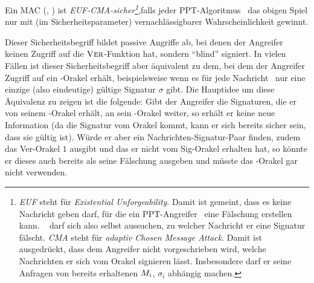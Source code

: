 Ein MAC (\sig, \ver) ist \textit{EUF-CMA-sicher\footnote{\textit{EUF} steht für
    \textit{Existential Unforgeability}. Damit ist gemeint, dass es
    keine Nachricht geben darf, für die ein PPT-Angreifer \A~eine
    Fälschung erstellen kann. \A~ darf sich also selbst aussuchen, zu
    welcher Nachricht er eine Signatur fälscht. \textit{CMA}
    steht für \textit{adaptiv Chosen Message Attack}. Damit ist ausgedrückt,
    dass dem Angreifer nicht vorgeschrieben wird, welche Nachrichten er
    sich vom Orakel signieren lässt. Insbesondere darf er seine Anfragen
    von bereits erhaltenen $M_i$, $\sigma_i$ abhängig machen.}},falls jeder
PPT-Algoritmus \A~das obigen Spiel nur mit (im Sicherheitsparameter)
vernachlässigbarer Wahrscheinlichkeit gewinnt.

Dieser Sicherheitsbegriff bildet passive Angriffe ab, bei denen der
Angreifer keinen Zugriff auf die $\textsc{Ver}$-Funktion hat, sondern "`blind"'
signiert. In vielen Fällen ist dieser Sicherheitsbegriff aber äquivalent
zu dem, bei dem der Angreifer Zugriff auf ein \ver-Orakel erhält,
beispielsweise wenn es für jede Nachricht \plaint~nur eine einzige (also
eindeutige) gültige Signatur $\sigma$ gibt. Die Hauptidee um diese
Äquivalenz zu zeigen ist die folgende: Gibt der Angreifer die
Signaturen, die er von seinem \sig-Orakel erhält, an sein \ver-Orakel
weiter, so erhält er keine neue Information (da die Signatur vom Orakel
kommt, kann er sich bereits sicher sein, dass sie gültig ist). Würde er
aber ein Nachrichten-Signatur-Paar finden, zudem das Ver-Orakel $1$
ausgibt und das er nicht vom Sig-Orakel erhalten hat, so könnte er
dieses auch bereits als seine Fälschung ausgeben und müsste das
\ver-Orakel gar nicht verwenden.

\begin{center} 
\end{center}

